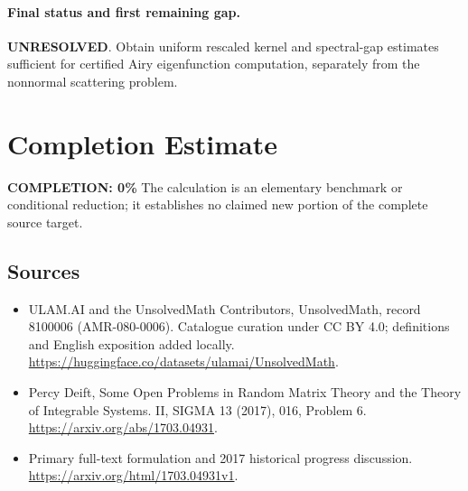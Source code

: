 \documentclass[11pt]{article}
\begin{document}
\paragraph{Final status and first remaining gap.}
\textbf{UNRESOLVED}. Obtain uniform rescaled kernel and spectral-gap estimates sufficient for certified Airy eigenfunction computation, separately from the nonnormal scattering problem.

\section{Completion Estimate}
\noindent\textbf{COMPLETION: 0\%}
The calculation is an elementary benchmark or conditional reduction; it establishes no claimed new portion of the complete source target.

\subsection{Sources}
\begin{itemize}
\item[\hypertarget{source:8100006:1}{S1}] ULAM.AI and the UnsolvedMath Contributors, UnsolvedMath, record 8100006 (AMR-080-0006). Catalogue curation under CC BY 4.0; definitions and English exposition added locally.
\url{https://huggingface.co/datasets/ulamai/UnsolvedMath}.
\item[\hypertarget{source:8100006:2}{S2}] Percy Deift, Some Open Problems in Random Matrix Theory and the Theory of Integrable Systems. II, SIGMA 13 (2017), 016, Problem 6.
\url{https://arxiv.org/abs/1703.04931}.
\item[\hypertarget{source:8100006:3}{S3}] Primary full-text formulation and 2017 historical progress discussion.
\url{https://arxiv.org/html/1703.04931v1}.
\end{itemize}
\label{end:8100006}
\end{document}
